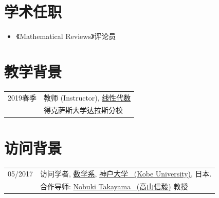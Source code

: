 \documentclass[a4paper,12pt]{article}
\begin{document}
\begin{CJK*}{UTF8}{gbsn}
\section*{学术任职}
\begin{itemize}
 \item 《Mathematical Reviews》评论员
\end{itemize}

\section*{教学背景}
\begin{tabular}{@{}p{1.4in}p{4in}}
2019春季           & 教师 (Instructor), \href{https://yzhang1616.github.io/algebra19spring/algebra.html}{线性代数} \\
                      & 得克萨斯大学达拉斯分校
\end{tabular}


\section*{\Large{访问背景}}
\begin{tabular}{@{}p{1.0in}p{4.5in}}
05/2017               & 访问学者, 
                        \href{http://www.math.kobe-u.ac.jp/}{数学系},
                        \href{http://www.kobe-u.ac.jp/en/}{神户大学 \ (Kobe University)}, 日本. \\                       
                        & 合作导师: \href{http://www.math.kobe-u.ac.jp/home-j/takayama-e.html}{Nobuki Takayama \ (高山信毅)} 教授\\
\end{tabular}




\end{CJK*}
\end{document}
